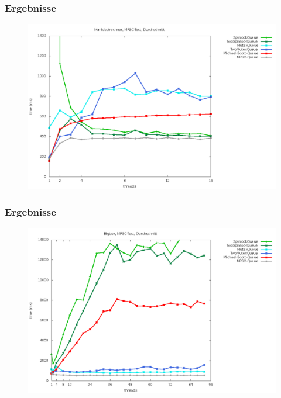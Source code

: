 \documentclass[svgnames]{beamer}
\begin{document}
\begin{frame}
\frametitle{Ergebnisse}
\begin {figure}
      \begin{center}
	\includegraphics[width=\textwidth]{mansa.png}
     \end{center}
\end {figure}
\end{frame}

\begin{frame}
\frametitle{Ergebnisse}
\begin {figure}
      \begin{center}
	\includegraphics[width=\textwidth]{bigboxsa.png}
     \end{center}
\end {figure}
\end{frame}
\end{document}
